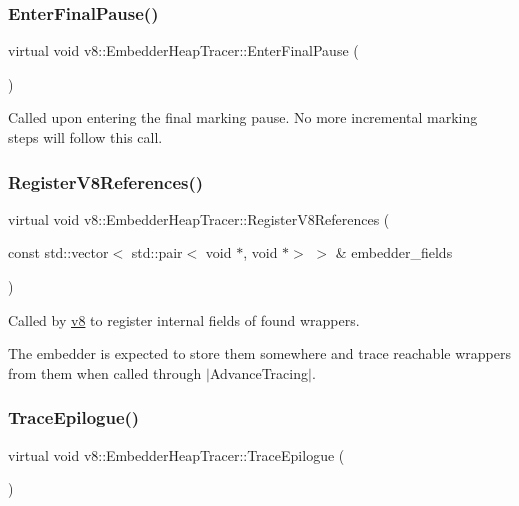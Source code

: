 \subsubsection{\texorpdfstring{Enter\+Final\+Pause()}{EnterFinalPause()}}
{\footnotesize\ttfamily virtual void v8\+::\+Embedder\+Heap\+Tracer\+::\+Enter\+Final\+Pause (\begin{DoxyParamCaption}{ }\end{DoxyParamCaption})\hspace{0.3cm}{\ttfamily [pure virtual]}}

Called upon entering the final marking pause. No more incremental marking steps will follow this call. \mbox{\label{classv8_1_1EmbedderHeapTracer_a849c52f45fbfe1fd30664031898bf0d8}} 
\subsubsection{\texorpdfstring{Register\+V8\+References()}{RegisterV8References()}}
{\footnotesize\ttfamily virtual void v8\+::\+Embedder\+Heap\+Tracer\+::\+Register\+V8\+References (\begin{DoxyParamCaption}\item[{const std\+::vector$<$ std\+::pair$<$ void $\ast$, void $\ast$$>$ $>$ \&}]{embedder\+\_\+fields }\end{DoxyParamCaption})\hspace{0.3cm}{\ttfamily [pure virtual]}}

Called by \mbox{\hyperlink{namespacev8}{v8}} to register internal fields of found wrappers.

The embedder is expected to store them somewhere and trace reachable wrappers from them when called through $\vert$\+Advance\+Tracing$\vert$. \mbox{\label{classv8_1_1EmbedderHeapTracer_a61b8dc3260247e2c47af8ad8f5775991}} 
\subsubsection{\texorpdfstring{Trace\+Epilogue()}{TraceEpilogue()}}
{\footnotesize\ttfamily virtual void v8\+::\+Embedder\+Heap\+Tracer\+::\+Trace\+Epilogue (\begin{DoxyParamCaption}{ }\end{DoxyParamCaption})\hspace{0.3cm}{\ttfamily [pure virtual]}}


